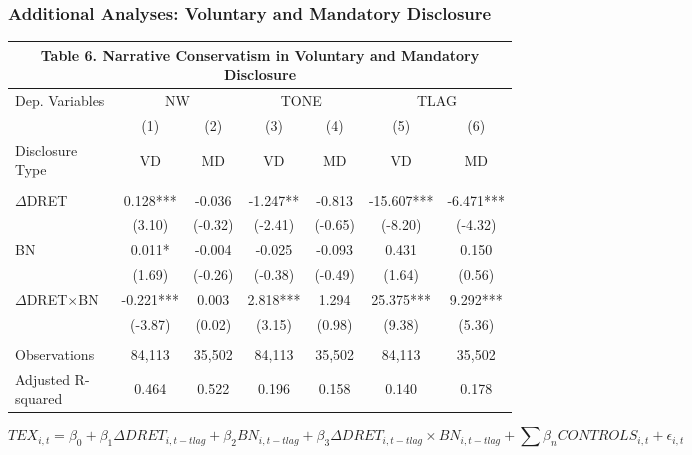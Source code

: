 \documentclass{beamer}
\begin{document}
\begin{frame}
\frametitle{Additional Analyses: Voluntary and Mandatory Disclosure}

\begin{table}[H] \label{T6}
	\begin{center} \scriptsize
		\begin{tabular}{lcccccc}
			\multicolumn{7}{c}{\textbf{Table 6. Narrative Conservatism in Voluntary and Mandatory Disclosure}} \\
			\midrule
			\midrule
			Dep. Variables & \multicolumn{2}{c}{NW} & \multicolumn{2}{c}{TONE} & \multicolumn{2}{c}{TLAG} \\
			\cmidrule{2-7}
			& (1) & (2) & (3) & (4) & (5) & (6) \\
			Disclosure Type & VD & MD & VD & MD & VD & MD \\
			\midrule
			&   &  &   &   &   & \\
			$\Delta$DRET & 0.128*** & -0.036 & -1.247** & -0.813 & -15.607*** & -6.471*** \\
			& (3.10) & (-0.32) & (-2.41) & (-0.65) & (-8.20) & (-4.32) \\
			BN & 0.011* & -0.004 & -0.025 & -0.093 & 0.431 & 0.150 \\
			& (1.69) & (-0.26) & (-0.38) & (-0.49) & (1.64) & (0.56) \\
			 $\Delta$DRET$\times$BN & -0.221*** & 0.003 & 2.818*** & 1.294 & 25.375*** & 9.292*** \\
			 & (-3.87) & (0.02) & (3.15) & (0.98) & (9.38) & (5.36) \\

			&&&&&&\\
			Observations & 84,113 & 35,502 & 84,113 & 35,502 & 84,113 & 35,502 \\
			Adjusted R-squared & 0.464 & 0.522 & 0.196 & 0.158 & 0.140 & 0.178 \\
			\midrule
			\bottomrule
		\end{tabular}%
	\end{center}
	\begin{footnotesize} \tiny
		\setcounter{equation}{1}
		\begin{equation}
		TEX_{i,t}=\beta_0+\beta_1\Delta DRET_{i,t-tlag}+\beta_2BN_{i,t-tlag}+\beta_3\Delta DRET_{i,t-tlag}\times BN_{i,t-tlag}+\sum\beta_nCONTROLS_{i,t}+\epsilon_{i,t}
		\end{equation}
		

\end{footnotesize}
\end{table}
\end{frame}
\end{document}
